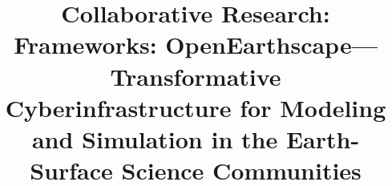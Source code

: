 \documentclass{proposalnsf}
\begin{document}
\title{\textbf{Collaborative Research: Frameworks: OpenEarthscape---Transformative Cyberinfrastructure for Modeling and Simulation in the Earth-Surface Science Communities}}


\newpage
\setcounter{page}{1}


\newpage
\setcounter{page}{1}
\renewcommand{\thepage} {R--\arabic{page}}
\renewcommand\refname{References Cited}




\newpage
{}


\newpage
\setcounter{page}{1}


\newpage
\setcounter{page}{1}


\newpage
\setcounter{page}{1}
	

\newpage
\setcounter{page}{1}
  

\newpage
\setcounter{page}{1}


\newpage
\setcounter{page}{1}

\end{document}
